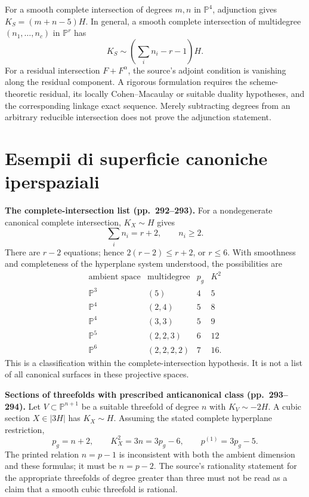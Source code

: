 For a smooth complete intersection of degrees \(m,n\) in \(\mathbb P^4\), adjunction gives \(K_S=(m+n-5)H\). In general, a smooth complete intersection of multidegree \((n_1,\ldots,n_c)\) in \(\mathbb P^r\) has
\[
K_S\sim\left(\sum_i n_i-r-1\right)H.
\]
For a residual intersection \(F+F^\alpha\), the source's adjoint condition is vanishing along the residual component. A rigorous formulation requires the scheme-theoretic residual, its locally Cohen--Macaulay or suitable duality hypotheses, and the corresponding linkage exact sequence. Merely subtracting degrees from an arbitrary reducible intersection does not prove the adjunction statement.

\section{Esempii di superficie canoniche iperspaziali}
\label{cp2-viii-10}

\textbf{The complete-intersection list (pp.~292--293).}
For a nondegenerate canonical complete intersection, \(K_X\sim H\) gives
\[
\sum_i n_i=r+2,\qquad n_i\geq2.
\]
There are \(r-2\) equations; hence \(2(r-2)\leq r+2\), or \(r\leq6\). With smoothness and completeness of the hyperplane system understood, the possibilities are
\[
\begin{array}{c|c|c|c}
\text{ambient space}&\text{multidegree}&p_g&K^2\\ \hline
\mathbb P^3&(5)&4&5\\
\mathbb P^4&(2,4)&5&8\\
\mathbb P^4&(3,3)&5&9\\
\mathbb P^5&(2,2,3)&6&12\\
\mathbb P^6&(2,2,2,2)&7&16 .
\end{array}
\]
This is a classification within the complete-intersection hypothesis. It is not a list of all canonical surfaces in these projective spaces.

\textbf{Sections of threefolds with prescribed anticanonical class (pp.~293--294).}
Let \(V\subset\mathbb P^{n+1}\) be a suitable threefold of degree \(n\) with \(K_V\sim-2H\). A cubic section \(X\in|3H|\) has \(K_X\sim H\). Assuming the stated complete hyperplane restriction,
\[
p_g=n+2,\qquad K_X^2=3n=3p_g-6,\qquad p^{(1)}=3p_g-5.
\]
The printed relation \(n=p-1\) is inconsistent with both the ambient dimension and these formulas; it must be \(n=p-2\). The source's rationality statement for the appropriate threefolds of degree greater than three must not be read as a claim that a smooth cubic threefold is rational.

